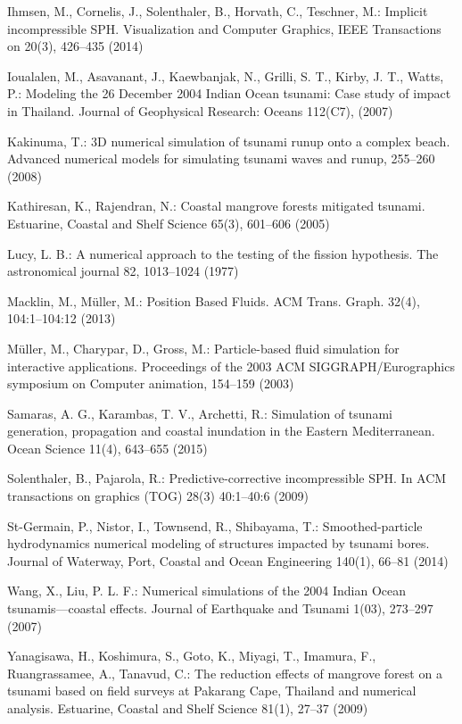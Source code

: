 \documentclass{llncs}
\begin{document}
\begin{thebibliography}{14}
 Ihmsen, M., Cornelis, J., Solenthaler, B., Horvath, C.,
  Teschner, M.: Implicit incompressible SPH. Visualization and Computer Graphics, IEEE
  Transactions on 20(3), 426--435 (2014)

 Ioualalen, M., Asavanant, J., Kaewbanjak, N., Grilli, S. T.,
  Kirby, J. T., Watts, P.: Modeling the 26 December 2004 Indian Ocean tsunami: Case study
  of impact in Thailand. Journal of Geophysical Research: Oceans 112(C7), (2007)

 Kakinuma, T.: 3D numerical simulation of tsunami runup onto a
  complex beach. Advanced numerical models for simulating tsunami waves and runup,
  255--260 (2008)

 Kathiresan, K., Rajendran, N.: Coastal mangrove forests
  mitigated tsunami. Estuarine, Coastal and Shelf Science 65(3), 601--606 (2005)

 Lucy, L. B.: A numerical approach to the testing of the fission
  hypothesis. The astronomical journal 82, 1013--1024 (1977)

 Macklin, M., M\"{u}ller, M.: Position Based Fluids. ACM
  Trans. Graph. 32(4), 104:1--104:12 (2013)

 M\"{u}ller, M., Charypar, D., Gross, M.: Particle-based fluid
  simulation for interactive applications. Proceedings of the 2003 ACM
  SIGGRAPH/Eurographics symposium on Computer animation, 154--159 (2003)

 Samaras, A. G., Karambas, T. V., Archetti, R.: Simulation of tsunami
  generation, propagation and coastal inundation in the Eastern Mediterranean. Ocean
  Science 11(4), 643--655 (2015)

 Solenthaler, B., Pajarola, R.: Predictive-corrective
  incompressible SPH. In ACM transactions on graphics (TOG) 28(3) 40:1--40:6 (2009)

 St-Germain, P., Nistor, I., Townsend, R., Shibayama, T.:
  Smoothed-particle hydrodynamics numerical modeling of structures impacted by tsunami
  bores. Journal of Waterway, Port, Coastal and Ocean Engineering 140(1), 66--81 (2014)

 Wang, X., Liu, P. L. F.: Numerical simulations of the 2004 Indian Ocean
  tsunamis—coastal effects. Journal of Earthquake and Tsunami 1(03), 273--297 (2007)

 Yanagisawa, H., Koshimura, S., Goto, K., Miyagi, T., Imamura,
  F., Ruangrassamee, A., Tanavud, C.: The reduction effects of mangrove forest on a
  tsunami based on field surveys at Pakarang Cape, Thailand and numerical
  analysis. Estuarine, Coastal and Shelf Science 81(1), 27--37 (2009)

\end{thebibliography}
\end{document}
